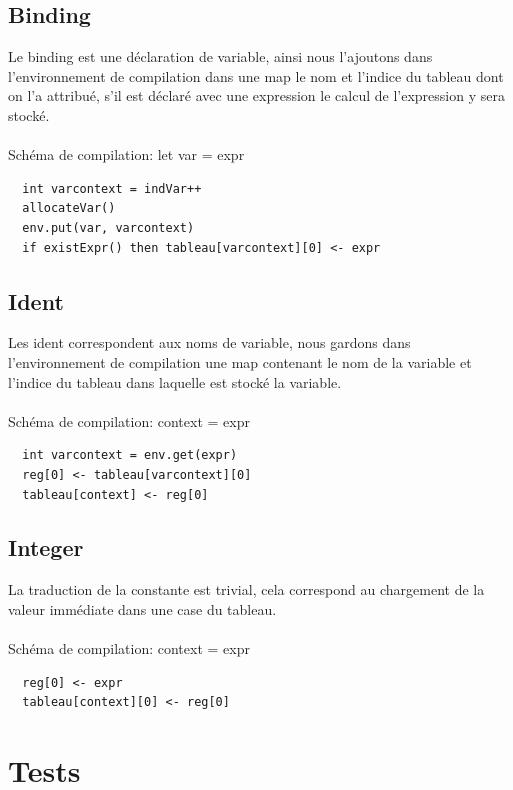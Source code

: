 \documentclass[a4paper,12pt]{report}
\begin{document}
\subsection{Binding}
Le binding est une déclaration de variable, ainsi nous l'ajoutons dans l'environnement de compilation dans une map le nom et l'indice
du tableau dont on l'a attribué, s'il est déclaré avec une expression le calcul de l'expression y sera stocké.
\\ \\
Schéma de compilation: let var = expr
\begin{verbatim}
  int varcontext = indVar++
  allocateVar()
  env.put(var, varcontext)
  if existExpr() then tableau[varcontext][0] <- expr
\end{verbatim}

\subsection{Ident}
Les ident correspondent aux noms de variable, nous gardons dans l'environnement de compilation une map contenant le nom de la variable
et l'indice du tableau dans laquelle est stocké la variable.
\\ \\
Schéma de compilation: context = expr
\begin{verbatim}
  int varcontext = env.get(expr)
  reg[0] <- tableau[varcontext][0]
  tableau[context] <- reg[0]
\end{verbatim}


\subsection{Integer}
La traduction de la constante est trivial, cela correspond au chargement de la valeur immédiate dans une case du tableau.
\\ \\
Schéma de compilation: context = expr
\begin{verbatim}
  reg[0] <- expr
  tableau[context][0] <- reg[0]
\end{verbatim}

\section{Tests}
\end{document}
